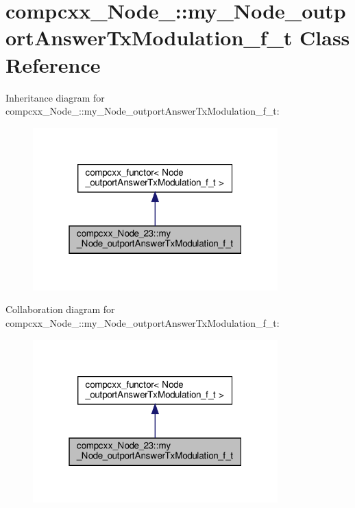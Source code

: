 \hypertarget{classcompcxx__Node__23_1_1my__Node__outportAnswerTxModulation__f__t}{}\section{compcxx\+\_\+\+Node\+\_\+:\+:my\+\_\+\+Node\+\_\+outport\+Answer\+Tx\+Modulation\+\_\+f\+\_\+t Class Reference}
\label{classcompcxx__Node__23_1_1my__Node__outportAnswerTxModulation__f__t}


Inheritance diagram for compcxx\+\_\+\+Node\+\_\+:\+:my\+\_\+\+Node\+\_\+outport\+Answer\+Tx\+Modulation\+\_\+f\+\_\+t\+:\nopagebreak
\begin{figure}[H]
\begin{center}
\leavevmode
\includegraphics[width=268pt]{classcompcxx__Node__23_1_1my__Node__outportAnswerTxModulation__f__t__inherit__graph}
\end{center}
\end{figure}


Collaboration diagram for compcxx\+\_\+\+Node\+\_\+:\+:my\+\_\+\+Node\+\_\+outport\+Answer\+Tx\+Modulation\+\_\+f\+\_\+t\+:\nopagebreak
\begin{figure}[H]
\begin{center}
\leavevmode
\includegraphics[width=268pt]{classcompcxx__Node__23_1_1my__Node__outportAnswerTxModulation__f__t__coll__graph}
\end{center}
\end{figure}
